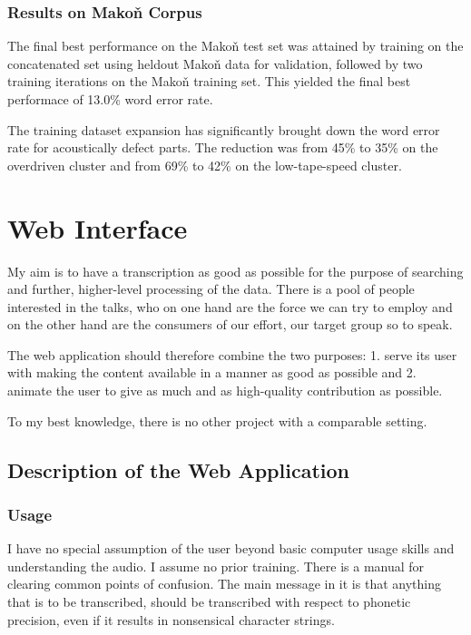 \documentclass[12pt,a4paper]{report}
\begin{document}
\subsection{Results on Makoň Corpus}

The final best performance on the Makoň test set was attained by training on the
concatenated set using heldout Makoň data for validation, followed by two
training iterations on the Makoň training set. This yielded the final best performace of 13.0\% word error rate.

The training dataset expansion has significantly brought down the word error
rate for acoustically defect parts. The reduction was from 45\% to 35\% on the
overdriven cluster and from 69\% to 42\% on the low-tape-speed cluster.

\chapter{Web Interface}

My aim is to have a transcription as good as possible for the purpose
of searching and further, higher-level processing of the data. There is a pool
of people interested in the talks, who on one hand are the force we can try to
employ and on the other hand are the consumers of our effort, our target group
so to speak.

The web application should therefore combine the two purposes: 1. serve its user
with making the content available in a manner as good as possible and 2. animate
the user to give as much and as high-quality contribution as possible.

To my best knowledge, there is no other project with a comparable setting.

\section{Description of the Web Application}

\subsection{Usage}

I have no special assumption of the user beyond basic computer usage skills and
understanding the audio. I assume no prior training. There is a manual for
clearing common points of confusion. The main message in it is that anything
that is to be transcribed, should be transcribed with respect to
phonetic precision, even if it results in nonsensical character strings.
\end{document}
